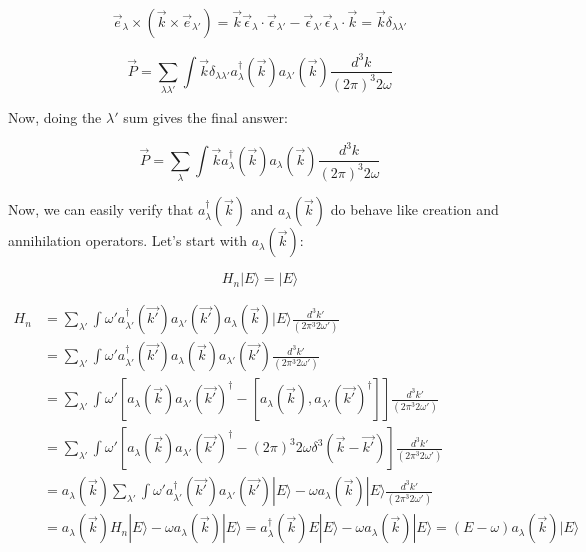 \documentclass[a4]{article}
\begin{document}
    \begin{equation}
        \vec{e}_{\lambda} \times (\vec{k} \times \vec{e}_{\lambda'}) = \vec{k} \vec{\epsilon}_{\lambda} \cdot \vec{\epsilon}_{\lambda'} - \vec{\epsilon}_{\lambda'} \vec{\epsilon}_{\lambda} \cdot \vec{k} = \vec{k} \delta_{\lambda \lambda'}
    \end{equation}

    \begin{equation}
        \vec{P} = \sum_{\lambda \lambda'} \int \vec{k} \delta_{\lambda \lambda'} a^{\dagger}_{\lambda} (\vec{k}) a_{\lambda'} (\vec{k}) \frac{d^{3} k}{(2 \pi)^{3} 2 \omega}
    \end{equation}

    Now, doing the $\lambda'$ sum gives the final answer:

    \begin{framed}
        \begin{equation}
            \vec{P} = \sum_{\lambda} \int \vec{k} a^{\dagger}_{\lambda} (\vec{k}) a_{\lambda} (\vec{k}) \frac{d^{3} k}{(2 \pi)^{3} 2 \omega}
        \end{equation}
    \end{framed}

    Now, we can easily verify that $a^{\dagger}_{\lambda} (\vec{k})$ and $a_{\lambda} (\vec{k})$ do behave like creation and annihilation operators.
    Let's start with $a_{\lambda} (\vec{k})$:

    \begin{equation}
        H_{n} | E \rangle = | E \rangle
    \end{equation}

    \begin{equation}
        \begin{aligned}
            H_{n} & = \sum_{\lambda'} \int \omega' a_{\lambda'}^{\dagger} (\vec{k'}) a_{\lambda'} (\vec{k'}) a_{\lambda} (\vec{k}) | E \rangle \frac{d^3 k'}{(2 \pi^{3} 2 \omega')} \\
            & = \sum_{\lambda'} \int \omega' a_{\lambda'}^{\dagger} (\vec{k'}) a_{\lambda} (\vec{k}) a_{\lambda'} (\vec{k'}) \frac{d^3 k'}{(2 \pi^{3} 2 \omega')} \\
            & = \sum_{\lambda'} \int \omega' [a_{\lambda} (\vec{k}) a_{\lambda'} (\vec{k'})^{\dagger} - [a_{\lambda} (\vec{k}), a_{\lambda'} (\vec{k'})^{\dagger}]] \frac{d^3 k'}{(2 \pi^{3} 2 \omega')} \\
            & = \sum_{\lambda'} \int \omega' [a_{\lambda} (\vec{k}) a_{\lambda'} (\vec{k'})^{\dagger} - (2 \pi)^{3} 2 \omega \delta^{3} (\vec{k} - \vec{k'})] \frac{d^3 k'}{(2 \pi^{3} 2 \omega')} \\
            & = a_{\lambda} (\vec{k}) \sum_{\lambda'} \int \omega' a_{\lambda'}^{\dagger} (\vec{k'}) a_{\lambda'} (\vec{k'}) | E \rangle - \omega a_{\lambda} (\vec{k}) | E \rangle \frac{d^3 k'}{(2 \pi^{3} 2 \omega')} \\
            & = a_{\lambda} (\vec{k}) H_{n} | E \rangle - \omega a_{\lambda} (\vec{k}) | E \rangle = a_{\lambda}^{\dagger} (\vec{k}) E | E \rangle - \omega a_{\lambda} (\vec{k}) | E \rangle = (E - \omega) a_{\lambda} (\vec{k}) | E \rangle
        \end{aligned}
    \end{equation}
\end{document}
